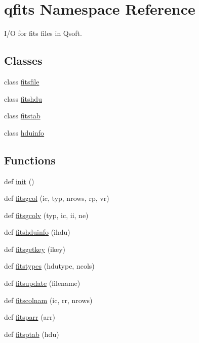 \hypertarget{namespaceqfits}{}\section{qfits Namespace Reference}
\label{namespaceqfits}


I/O for fits files in Qsoft.  


\subsection*{Classes}
\begin{DoxyCompactItemize}
\item 
class \hyperlink{classqfits_1_1fitsfile}{fitsfile}
\item 
class \hyperlink{classqfits_1_1fitshdu}{fitshdu}
\item 
class \hyperlink{classqfits_1_1fitstab}{fitstab}
\item 
class \hyperlink{classqfits_1_1hduinfo}{hduinfo}
\end{DoxyCompactItemize}
\subsection*{Functions}
\begin{DoxyCompactItemize}
\item 
def \hyperlink{namespaceqfits_a7264377311086208aca7e92c5c88752c}{init} ()
\item 
def \hyperlink{namespaceqfits_a2468c5a46640e7a5405bc1b66c75a99e}{fitsgcol} (ic, typ, nrows, rp, vr)
\item 
def \hyperlink{namespaceqfits_abb185e590203be183a2b025b89c27599}{fitsgcolv} (typ, ic, ii, ne)
\item 
def \hyperlink{namespaceqfits_ab1144d003dd9234f36d0cdd92ac004d2}{fitshduinfo} (ihdu)
\item 
def \hyperlink{namespaceqfits_a3869b276d00a536ba46704675d677ce2}{fitsgetkey} (ikey)
\item 
def \hyperlink{namespaceqfits_a69998ab4fd7c39c53012bf441e224c9e}{fitstypes} (hdutype, ncols)
\item 
def \hyperlink{namespaceqfits_ae2d60441a901e17e35deaae6ff2e251b}{fitsupdate} (filename)
\item 
def \hyperlink{namespaceqfits_a5f967db5997b8ec294baffb292116d36}{fitscolnam} (ic, rr, nrows)
\item 
def \hyperlink{namespaceqfits_a1bd7a6e17d916ce23ed143bf0d23f028}{fitsparr} (arr)
\item 
def \hyperlink{namespaceqfits_a06a6a0e4363443cea2896d24954b91b1}{fitsptab} (hdu)
\end{DoxyCompactItemize}


